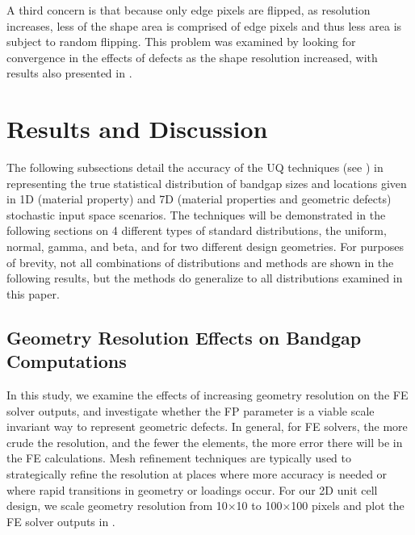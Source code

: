 \documentclass[preprint,review,12pt]{elsarticle}
\begin{document}
A third concern is that because only edge pixels are flipped, as resolution increases, less of the shape area is comprised of edge pixels and thus less area is subject to random flipping. This problem was examined by looking for convergence in the effects of defects as the shape resolution increased, with results also presented in . 
\section{Results and Discussion}
\label{sec:Results}
The following subsections detail the accuracy of the UQ techniques (see ) in representing the true statistical distribution of bandgap sizes and locations given  in 1D (material property) and 7D (material properties and geometric defects) stochastic input space scenarios. The techniques will be demonstrated in the following sections on 4 different types of standard distributions, the uniform, normal, gamma, and beta, and for two different design geometries. For purposes of brevity, not all combinations of distributions and methods are shown in the following results, but the methods do generalize to all distributions examined in this paper. 
\subsection{Geometry Resolution Effects on Bandgap Computations}
\label{subsec:r_geo}
In this study, we examine the effects of increasing geometry resolution on the FE solver outputs, and investigate whether the FP parameter is a viable scale invariant way to represent geometric defects. In general, for FE solvers, the more crude the resolution, and the fewer the elements, the more error there will be in the FE calculations. Mesh refinement techniques are typically used to strategically refine the resolution at places where more accuracy is needed or where rapid transitions in geometry or loadings occur. For our 2D unit cell design, we scale geometry resolution from 10$\times$10 to 100$\times$100 pixels and plot the FE solver outputs in .
\end{document}
